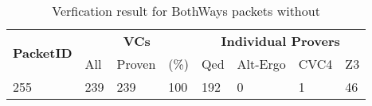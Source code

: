 \FloatBarrier  %

\begin{table}[hbt]
\begin{center}
    \begin{tabular}{|m{10ex}|m{5ex}m{5ex}m{5ex}|m{5ex}m{5ex}m{5ex}m{5ex}|}
\hline
\multirow{2}{*}{\textbf{PacketID}} &
\multicolumn{3}{c|}{ \textbf{VCs}} &
\multicolumn{4}{c|}{\textbf{Individual Provers}}\\
\cline{2-8}
               &  All & Proven & (\%) & Qed & Alt-Ergo & CVC4 & Z3  \\
\hline
\hline
255 & 239 & 239 & 100 & 192 & 0 & 1 & 46\\
\hline
\end{tabular}
\end{center}
\caption{\label{tbl:packets-without-niter-bothways} Verfication result for BothWays packets without }
\end{table}

\FloatBarrier  %

